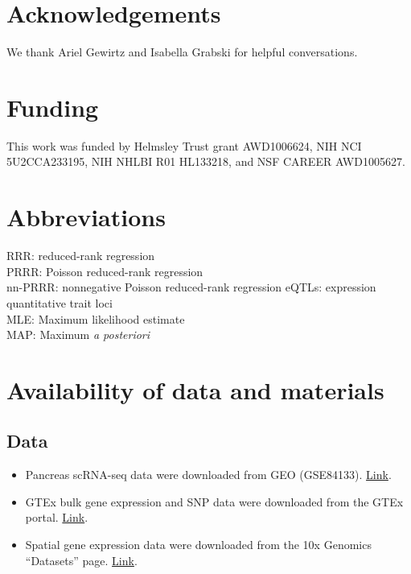 \documentclass{bmcart}
\begin{document}

\begin{backmatter}

\section*{Acknowledgements}%
We thank Ariel Gewirtz and Isabella Grabski for helpful conversations.

\section*{Funding}%
This work was funded by Helmsley Trust grant AWD1006624, NIH NCI 5U2CCA233195, NIH NHLBI R01 HL133218, and NSF CAREER AWD1005627.

\section*{Abbreviations}%
RRR: reduced-rank regression \\
PRRR: Poisson reduced-rank regression \\
nn-PRRR: nonnegative Poisson reduced-rank regression
eQTLs: expression quantitative trait loci \\
MLE: Maximum likelihood estimate \\
MAP: Maximum \emph{a posteriori} \\

\section*{Availability of data and materials}%
\subsection*{Data}
\begin{itemize}
    \item Pancreas scRNA-seq data were downloaded from GEO (GSE84133). \href{https://www.ncbi.nlm.nih.gov/geo/query/acc.cgi?acc=GSE84133}{Link}.
    \item GTEx bulk gene expression and SNP data were downloaded from the GTEx portal. \href{https://gtexportal.org/home/datasets}{Link}.
    \item Spatial gene expression data were downloaded from the 10x Genomics ``Datasets'' page. \href{https://www.10xgenomics.com/resources/datasets?query=&page=1&configure%5Bfacets%5D%5B0%5D=chemistryVersionAndThroughput&configure%5Bfacets%5D%5B1%5D=pipeline.version&configure%5BhitsPerPage%5D=500&menu%5Bproducts.name%5D=}{Link}.
\end{itemize}


\end{backmatter}
\end{document}
